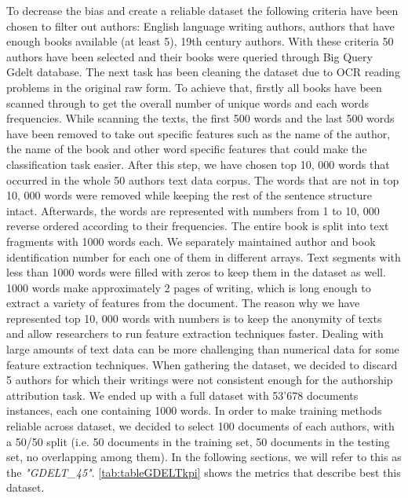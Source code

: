 To decrease the bias and create a reliable dataset the following criteria have been chosen to filter out authors: English language writing authors, authors that have enough books available (at least 5), 19th century authors. With these criteria 50
authors have been selected and their books were queried through Big Query Gdelt
database. The next task has been cleaning the dataset due to OCR reading problems
in the original raw form. To achieve that, firstly all books have been scanned through
to get the overall number of unique words and each words frequencies. While scanning
the texts, the first 500 words and the last 500 words have been removed to take out
specific features such as the name of the author, the name of the book and other word
specific features that could make the classification task easier. After this step, we have
chosen top 10, 000 words that occurred in the whole 50 authors text data corpus. The
words that are not in top 10, 000 words were removed while keeping the rest of the
sentence structure intact. Afterwards, the words are represented with numbers from
1 to 10, 000 reverse ordered according to their frequencies. The entire book is split
into text fragments with 1000 words each. We separately maintained author and
book identification number for each one of them in different arrays. Text segments
with less than 1000 words were filled with zeros to keep them in the dataset as well.
1000 words make approximately 2 pages of writing, which is long enough to extract a variety of features from the document. The reason why we have represented top
10, 000 words with numbers is to keep the anonymity of texts and allow researchers
to run feature extraction techniques faster. Dealing with large amounts of text data
can be more challenging than numerical data for some feature extraction techniques.
When gathering the dataset, we decided to discard 5 authors for which their writings were not consistent enough for the authorship attribution task.
We ended up with a full dataset with 53'678 documents instances, each one containing 1000 words.
In order to make training methods reliable across dataset, we decided to select 100 documents of each authors, with a 50/50 split (i.e. 50 documents in the training set, 50 documents in the testing set, no overlapping among them). In the following sections, we will refer to this as the \textit{"GDELT\_45"}.
\autoref{tab:tableGDELTkpi} shows the metrics that describe best this dataset.

